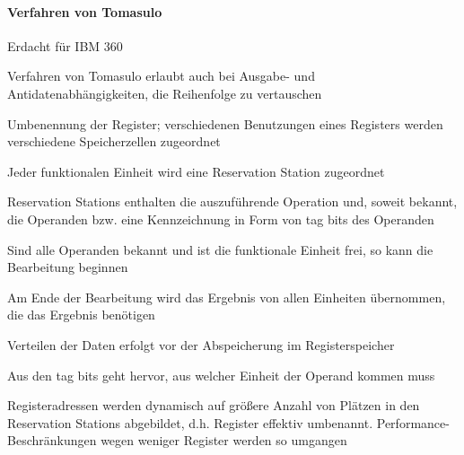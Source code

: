 \documentclass[10pt,landscape]{article}
\begin{document}
\begin{multicols}{3}
  \paragraph{ Verfahren von Tomasulo}
  \begin{itemize*}
    \item Erdacht für IBM 360
    \item Verfahren von Tomasulo erlaubt auch bei Ausgabe- und Antidatenabhängigkeiten, die Reihenfolge zu vertauschen
    \item Umbenennung der Register; verschiedenen Benutzungen eines Registers werden verschiedene Speicherzellen zugeordnet
    \item Jeder funktionalen Einheit wird eine Reservation Station zugeordnet
    \item Reservation Stations enthalten die auszuführende Operation und, soweit bekannt, die Operanden bzw. eine Kennzeichnung in Form von tag bits des Operanden
    \item Sind alle Operanden bekannt und ist die funktionale Einheit frei, so kann die Bearbeitung beginnen
    \item Am Ende der Bearbeitung wird das Ergebnis von allen Einheiten übernommen, die das Ergebnis benötigen
    \item Verteilen der Daten erfolgt vor der Abspeicherung im Registerspeicher
    \item Aus den tag bits geht hervor, aus welcher Einheit der Operand kommen muss
    \item Registeradressen werden dynamisch auf größere Anzahl von Plätzen in den Reservation Stations abgebildet, d.h. Register effektiv umbenannt. Performance-Beschränkungen wegen weniger Register werden so umgangen
  \end{itemize*}
  

\end{multicols}
\end{document}

